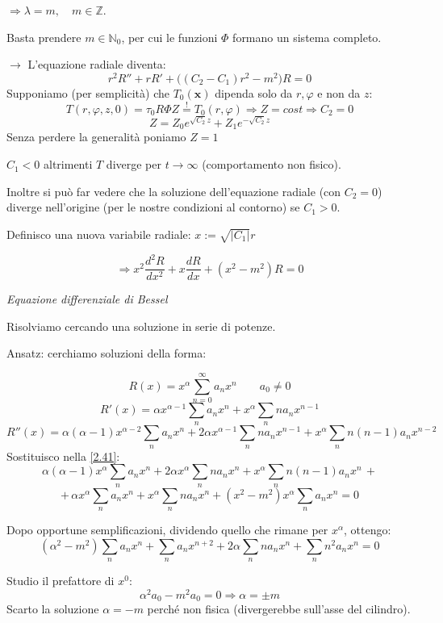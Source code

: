 \documentclass[a4paper,11pt]{report}
\newcommand{\x}{\boldsymbol{x}}
\begin{document}
$\Rightarrow \lambda=m, \quad m \in \mathbb{Z}$. 

Basta prendere $m\in \mathbb{N}_0$, per cui le funzioni $\Phi$ formano un sistema completo.

$\rightarrow $ L'equazione radiale diventa:
\[
r^2 R'' + r R' + \big((C_2-C_1)r^2-m^2\big)R=0
\]
Supponiamo (per semplicit\`a) che $T_0(\x)$ dipenda solo da $r,\varphi$ e non da $z$:
\[
T(r,\varphi,z,0)=\tau_0R\Phi Z\overset{!}{=}T_0(r,\varphi)\Rightarrow Z=cost \Rightarrow C_2=0
\]
\[
Z=Z_0e^{\sqrt{C_2}z}+Z_1e^{-\sqrt{C_2}z}
\]
Senza perdere la generalit\`a poniamo $Z=1$

$C_1<0$ altrimenti $T$ diverge per $t\to \infty$ (comportamento non fisico). 

Inoltre si pu\`o far vedere che la soluzione dell'equazione radiale (con $C_2=0$) diverge nell'origine (per le nostre condizioni al contorno) se $C_1>0$.

Definisco una nuova variabile radiale: $x:=\sqrt{|C_1|}r$

\begin{equation}
\Rightarrow x^2\frac{d^2 R}{dx^2}+x\frac{dR}{dx}+(x^2-m^2)R=0
\label{2.41}
\end{equation}
\centerline{\emph{Equazione differenziale di Bessel}}

\medskip

Risolviamo cercando una soluzione in serie di potenze.

Ansatz: cerchiamo soluzioni della forma:

\begin{equation}
R(x)=x^\alpha \sum_{n=0}^{\infty} a_nx^n \qquad a_0\neq 0
\end{equation}
\[
R'(x)=\alpha x^{\alpha -1}\sum_n a_nx^n + x^\alpha\sum_n na_nx^{n-1}
\]
\[
R''(x)=\alpha(\alpha-1)x^{\alpha-2}\sum_na_nx^n + 2\alpha x^{\alpha-1}\sum_n n a_n x^{n-1}+x^\alpha\sum_n n(n-1)a_nx^{n-2}
\]
Sostituisco nella \eqref{2.41}:
\[
\alpha(\alpha-1)x^\alpha\sum_n a_n x^n+2\alpha x^\alpha \sum_n n a_n x^n + x^\alpha \sum_n n(n-1)a_n x^n \,+
\]
\[
+\, \alpha x^\alpha\sum_n a_n x^n + x^\alpha \sum_n n a_n x^n + (x^2-m^2)x^\alpha \sum_n a_n x^n=0
\]

Dopo opportune semplificazioni, dividendo quello che rimane per $x^\alpha$, ottengo:
\[
(\alpha^2-m^2)\sum_n a_n x^n + \sum_n a_n x^{n+2} + 2 \alpha \sum_n n a_n x^n + \sum_n n^2 a_n x^n = 0
\]

Studio il prefattore di $x^0$: 
\[
\alpha^2 a_0-m^2a_0=0\Rightarrow \alpha=\pm m
\]
Scarto la soluzione $\alpha=-m$ perch\'e non fisica (divergerebbe sull'asse del cilindro).
\end{document}
